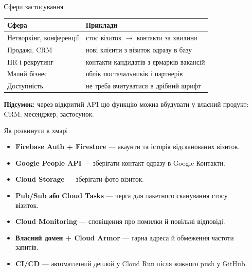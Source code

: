 \documentclass[aspectratio=169,11pt]{beamer}
\newcommand{\summary}[1]{\par\medskip\textbf{Підсумок:} #1}
\begin{document}
\begin{frame}{Сфери застосування}
  \centering
  \begin{tabular}{ll}
    \toprule
    \textbf{Сфера} & \textbf{Приклади} \\
    \midrule
    Нетворкінг, конференції & стос візиток $\to$ контакти за хвилини \\
    Продажі, CRM & нові клієнти з візиток одразу в базу \\
    HR і рекрутинг & контакти кандидатів з ярмарків вакансій \\
    Малий бізнес & облік постачальників і партнерів \\
    Доступність & не треба вчитуватися в дрібний шрифт \\
    \bottomrule
  \end{tabular}

  \raggedright
  \summary{через відкритий API цю функцію можна вбудувати у власний продукт: CRM, месенджер, застосунок.}
\end{frame}

\begin{frame}{Як розвинути в хмарі}
  \begin{itemize}
    \item \textbf{Firebase Auth + Firestore} --- акаунти та історія відсканованих візиток.
    \item \textbf{Google People API} --- зберігати контакт одразу в Google Контакти.
    \item \textbf{Cloud Storage} --- зберігати фото візиток.
    \item \textbf{Pub/Sub або Cloud Tasks} --- черга для пакетного сканування стосу візиток.
    \item \textbf{Cloud Monitoring} --- сповіщення про помилки й повільні відповіді.
    \item \textbf{Власний домен + Cloud Armor} --- гарна адреса й обмеження частоти запитів.
    \item \textbf{CI/CD} --- автоматичний деплой у Cloud Run після кожного push у GitHub.
  \end{itemize}
\end{frame}
\end{document}
